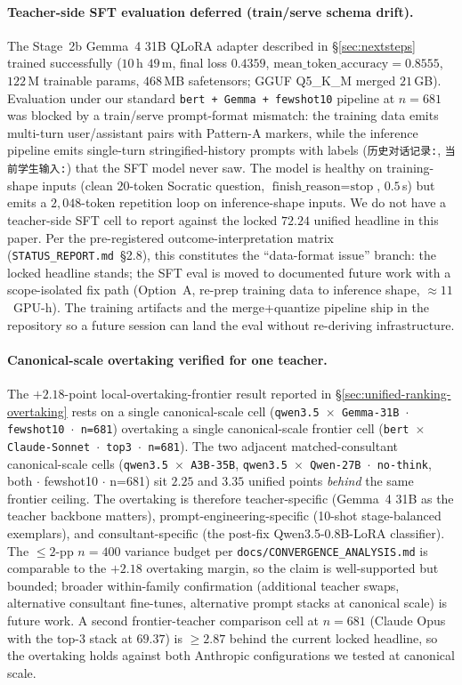 \documentclass[11pt]{article}
\begin{document}
\paragraph{Teacher-side SFT evaluation deferred (train/serve schema drift).} The Stage~2b Gemma~4 31B QLoRA adapter described in \S\ref{sec:nextsteps} trained successfully ($10$\,h $49$\,m, final loss $0.4359$, $\text{mean\_token\_accuracy}{=}0.8555$, $122$\,M trainable params, $468$\,MB safetensors; GGUF Q5\_K\_M merged $21$\,GB). Evaluation under our standard \texttt{bert + Gemma + fewshot10} pipeline at $n{=}681$ was blocked by a train/serve prompt-format mismatch: the training data emits multi-turn user/assistant pairs with Pattern-A markers, while the inference pipeline emits single-turn stringified-history prompts with labels (\texttt{历史对话记录:}, \texttt{当前学生输入:}) that the SFT model never saw. The model is healthy on training-shape inputs (clean $20$-token Socratic question, $\text{finish\_reason}{=}\text{stop}$, $0.5$\,s) but emits a $2{,}048$-token repetition loop on inference-shape inputs. We do not have a teacher-side SFT cell to report against the locked $72.24$ unified headline in this paper. Per the pre-registered outcome-interpretation matrix (\texttt{STATUS\_REPORT.md}~\S 2.8), this constitutes the ``data-format issue'' branch: the locked headline stands; the SFT eval is moved to documented future work with a scope-isolated fix path (Option~A, re-prep training data to inference shape, $\approx 11$~GPU-h). The training artifacts and the merge+quantize pipeline ship in the repository so a future session can land the eval without re-deriving infrastructure.

\paragraph{Canonical-scale overtaking verified for one teacher.} The $+2.18$-point local-overtaking-frontier result reported in \S\ref{sec:unified-ranking-overtaking} rests on a single canonical-scale cell (\texttt{qwen3.5 $\times$ Gemma-31B $\cdot$ fewshot10 $\cdot$ n=681}) overtaking a single canonical-scale frontier cell (\texttt{bert $\times$ Claude-Sonnet $\cdot$ top3 $\cdot$ n=681}). The two adjacent matched-consultant canonical-scale cells (\texttt{qwen3.5 $\times$ A3B-35B}, \texttt{qwen3.5 $\times$ Qwen-27B $\cdot$ no-think}, both $\cdot$ fewshot10 $\cdot$ n=681) sit $2.25$ and $3.35$ unified points \emph{behind} the same frontier ceiling. The overtaking is therefore teacher-specific (Gemma~4 31B as the teacher backbone matters), prompt-engineering-specific (10-shot stage-balanced exemplars), and consultant-specific (the post-fix Qwen3.5-0.8B-LoRA classifier). The $\leq 2$-pp $n{=}400$ variance budget per \texttt{docs/CONVERGENCE\_ANALYSIS.md} is comparable to the $+2.18$ overtaking margin, so the claim is well-supported but bounded; broader within-family confirmation (additional teacher swaps, alternative consultant fine-tunes, alternative prompt stacks at canonical scale) is future work. A second frontier-teacher comparison cell at $n{=}681$ (Claude Opus with the top-3 stack at $69.37$) is $\geq 2.87$ behind the current locked headline, so the overtaking holds against both Anthropic configurations we tested at canonical scale.
\end{document}
